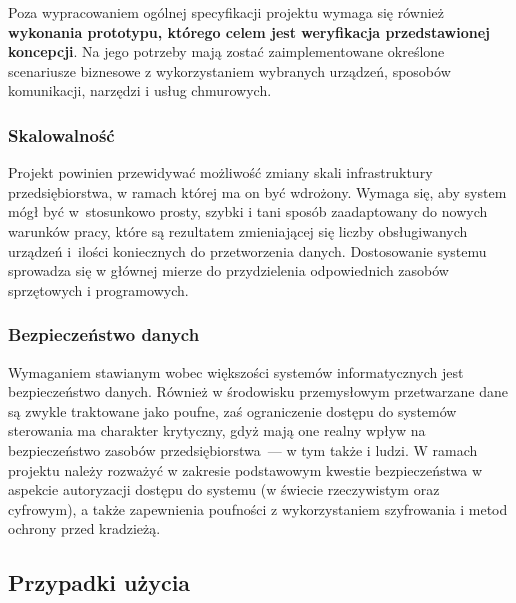 \documentclass[a4paper, 12pt, twoside]{article}
\begin{document}
Poza wypracowaniem ogólnej specyfikacji projektu wymaga się
również \textbf{wykonania prototypu, którego celem jest weryfikacja przedstawionej koncepcji}.
Na jego potrzeby mają zostać zaimplementowane określone scenariusze
biznesowe z wykorzystaniem wybranych urządzeń, sposobów komunikacji, narzędzi i
usług chmurowych.

\subsubsection{Skalowalność}

Projekt powinien przewidywać możliwość zmiany skali infrastruktury przedsiębiorstwa,
w ramach której ma on być wdrożony. Wymaga się, aby system mógł być
w~stosunkowo prosty, szybki i tani sposób zaadaptowany do nowych warunków pracy,
które są rezultatem zmieniającej się liczby obsługiwanych
urządzeń i~ilości koniecznych do przetworzenia danych. Dostosowanie systemu sprowadza
się w głównej mierze do przydzielenia odpowiednich zasobów sprzętowych i programowych.

\subsubsection{Bezpieczeństwo danych}

Wymaganiem stawianym wobec większości systemów informatycznych jest bezpieczeństwo
danych. Również w środowisku przemysłowym przetwarzane dane są zwykle traktowane
jako poufne, zaś ograniczenie dostępu do systemów sterowania ma charakter krytyczny,
gdyż mają one realny wpływ na bezpieczeństwo zasobów przedsiębiorstwa~--- w tym także
i ludzi. W ramach projektu należy rozważyć w zakresie podstawowym kwestie
bezpieczeństwa w aspekcie autoryzacji dostępu do systemu (w świecie rzeczywistym oraz
cyfrowym), a także zapewnienia poufności z wykorzystaniem szyfrowania i
metod ochrony przed kradzieżą.

\subsection{Przypadki użycia}
\end{document}
